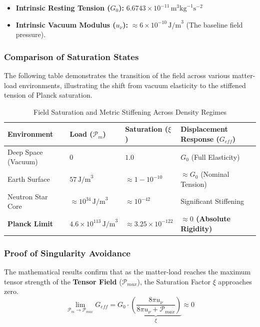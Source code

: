 \documentclass{article}
\begin{document}
\begin{itemize}
    \item \textbf{Intrinsic Resting Tension ($G_0$):} $6.6743 \times 10^{-11} \, \text{m}^3\text{kg}^{-1}\text{s}^{-2}$ \cite{CODATA2018}
    \item \textbf{Intrinsic Vacuum Modulus ($u_\nu$):} $\approx 6 \times 10^{-10} \, \text{J/m}^3$ (The baseline field pressure).
\end{itemize}

\subsubsection{Comparison of Saturation States}
The following table demonstrates the transition of the field across various matter-load environments, illustrating the shift from vacuum elasticity to the stiffened tension of Planck saturation.



\begin{table}[h!]
\centering
\renewcommand{\arraystretch}{1.5}
\begin{tabular}{|l|l|l|l|}
\hline
\textbf{Environment} & \textbf{Load ($\mathcal{P}_m$)} & \textbf{Saturation ($\xi$)} & \textbf{Displacement Response ($G_{eff}$)} \\ \hline
Deep Space (Vacuum) & $0$ & $1.0$ & $G_0$ (Full Elasticity) \\ \hline
Earth Surface & $57 \, \text{J/m}^3$ & $\approx 1 - 10^{-10}$ & $\approx G_0$ (Nominal Tension) \\ \hline
Neutron Star Core & $\approx 10^{34} \, \text{J/m}^3$ & $\approx 10^{-42}$ & Significant Stiffening \\ \hline
\textbf{Planck Limit} & $4.6 \times 10^{113} \, \text{J/m}^3$ & $\approx 3.25 \times 10^{-122}$ & \textbf{$\approx 0$ (Absolute Rigidity)} \\ \hline
\end{tabular}
\caption{Field Saturation and Metric Stiffening Across Density Regimes}
\label{tab:saturation_values}
\end{table}

\subsubsection{Proof of Singularity Avoidance}
The mathematical results confirm that as the matter-load reaches the maximum tensor strength of the \textbf{Tensor Field} ($\mathcal{P}_{max}$), the Saturation Factor $\xi$ approaches zero.
\begin{equation}
\lim_{\mathcal{P}_m \to \mathcal{P}_{max}} G_{eff} = G_0 \cdot \underbrace{\left( \frac{8\pi u_\nu}{8\pi u_\nu + \mathcal{P}_{max}} \right)}_{\xi} \approx 0
\end{equation}
\end{document}
